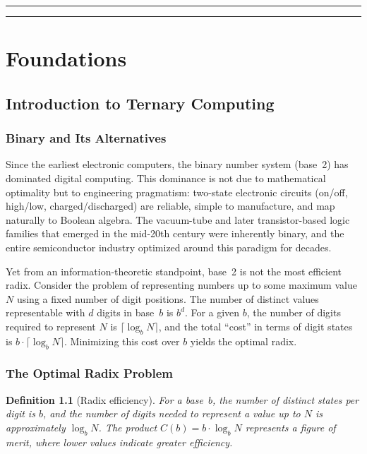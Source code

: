 \documentclass[12pt,a4paper,twoside]{book}
\theoremstyle{trinarytheorem}
\theoremstyle{trinarydefinition}
\newtheorem{definition}{Definition}[chapter]
\begin{document}
{\color{trinaryblue}\rule{\textwidth}{0.5pt}}\vspace{0.3cm}
\tableofcontents
\vspace{0.3cm}
{\color{trinaryblue}\rule{\textwidth}{0.5pt}}

\part{Foundations}

\chapter{Introduction to Ternary Computing}
\label{ch:intro}

\section{Binary and Its Alternatives}

Since the earliest electronic computers, the binary number system (base~2) has dominated
digital computing. This dominance is not due to mathematical optimality but to engineering
pragmatism: two-state electronic circuits (on/off, high/low, charged/discharged) are
reliable, simple to manufacture, and map naturally to Boolean algebra. The vacuum-tube
and later transistor-based logic families that emerged in the mid-20th century were
inherently binary, and the entire semiconductor industry optimized around this
paradigm for decades.

Yet from an information-theoretic standpoint, base~2 is not the most efficient radix.
Consider the problem of representing numbers up to some maximum value $N$ using a fixed
number of digit positions. The number of distinct values representable with $d$ digits in
base~$b$ is $b^d$. For a given $b$, the number of digits required to represent $N$ is
$\lceil\log_b N\rceil$, and the total ``cost'' in terms of digit states is $b \cdot
\lceil\log_b N\rceil$. Minimizing this cost over $b$ yields the optimal radix.

\section{The Optimal Radix Problem}

\begin{definition}[Radix efficiency]
For a base~$b$, the number of distinct states per digit is $b$, and the number of digits
needed to represent a value up to $N$ is approximately $\log_b N$. The product
$C(b) = b \cdot \log_b N$ represents a figure of merit, where lower values indicate
greater efficiency.
\end{definition}
\end{document}
